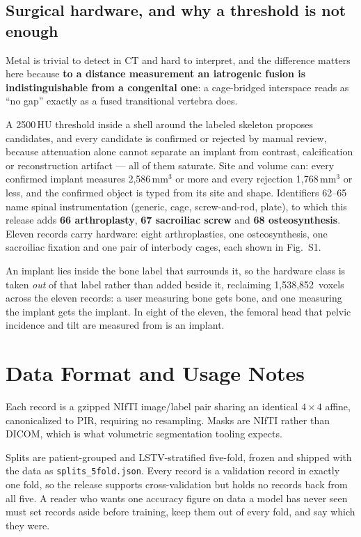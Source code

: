 \documentclass[aapm,mph,amsmath,amssymb,reprint]{revtex4-2}
\begin{document}
\subsection{Surgical hardware, and why a threshold is not enough}
\label{sec:hardware}

Metal is trivial to detect in CT and hard to interpret, and the difference matters here because
\textbf{to a distance measurement an iatrogenic fusion is indistinguishable from a congenital
one}: a cage-bridged interspace reads as ``no gap'' exactly as a fused transitional vertebra
does.

A 2500\,HU threshold inside a shell around the labeled skeleton proposes candidates, and every
candidate is confirmed or rejected by manual review, because attenuation alone cannot separate
an implant from contrast, calcification or reconstruction artifact --- all of them saturate.
Site and volume can: every confirmed implant measures 2,586\,mm$^3$ or more and every rejection
1,768\,mm$^3$ or less, and the confirmed object is typed from its site and shape. Identifiers
62--65 name spinal instrumentation (generic, cage, screw-and-rod, plate), to which this release
adds \textbf{66 arthroplasty}, \textbf{67 sacroiliac screw} and \textbf{68 osteosynthesis}.
Eleven records carry hardware: eight arthroplasties, one osteosynthesis, one sacroiliac
fixation and one pair of interbody cages, each shown in Fig.~S1.

An implant lies inside the bone label that surrounds it, so the hardware class is taken
\emph{out} of that label rather than added beside it, reclaiming 1,538,852\ voxels across
the eleven records: a user measuring bone gets bone, and one measuring the implant gets the
implant. In eight of the eleven, the femoral head that pelvic incidence and tilt are measured
from is an implant.

\section{Data Format and Usage Notes}\label{sec:format}

Each record is a gzipped NIfTI image/label pair sharing an identical $4\times4$ affine,
canonicalized to PIR, requiring no resampling. Masks are NIfTI rather than DICOM, which is what
volumetric segmentation tooling expects.

Splits are patient-grouped and LSTV-stratified five-fold, frozen and shipped with the data
as \texttt{splits\_5fold.json}. Every record is a validation record in exactly one fold, so
the release supports cross-validation but holds no records back from all five. A reader who
wants one accuracy figure on data a model has never seen must set records aside before
training, keep them out of every fold, and say which they were.
\end{document}
